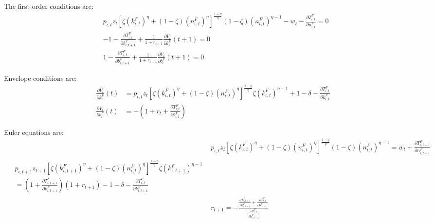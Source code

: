 \documentclass[letterpaper,12pt]{article}
\theoremstyle{definition}
\begin{document}
\begin{spacing}{1.5}
      The first-order conditions are:
      \begin{align}
         & p_{\iota,t} z_t \left[ \zeta (k^F_{\iota,t})^\eta + (1-\zeta)(n^F_{\iota,t})^\eta \right]^{\frac{1-\eta}{\eta}}(1-\zeta)(n^F_{\iota,t})^{\eta-1} - w_t - \frac{\partial T^F_{\iota,t}}{\partial n^F_{\iota,t}}  = 0 \nonumber\\
         & -1 - \frac{\partial T^F_{\iota,t}}{\partial k^F_{\iota,t+1}} + \frac{1}{1+r_{t+1}} \frac{\partial V_\iota}{\partial k^F_{\iota}}(t+1) = 0 \nonumber \\
         & 1 - \frac{\partial T^F_{\iota,t}}{\partial b^F_{\iota,t+1}} + \frac{1}{1+r_{t+1}} \frac{\partial V_\iota}{\partial b^F_{\iota}}(t+1) = 0 \nonumber 
      \end{align}

      Envelope conditions are:
      \begin{align}
         \frac{\partial V_\iota}{\partial k^F_{\iota}}(t) & = p_{\iota,t} z_t \left[ \zeta (k^F_{\iota,t})^\eta + (1-\zeta)(n^F_{\iota,t})^\eta \right]^{\frac{1-\eta}{\eta}}\zeta (k^F_{\iota,t})^{\eta-1} + 1 - \delta - \frac{\partial T^F_{\iota,t}}{\partial k^F_{\iota,t}}  \nonumber \\
         \frac{\partial V_\iota}{\partial b^F_{\iota}}(t) & = - \left( 1+r_t+\frac{\partial T^F_{\iota,t}}{\partial b^F_{\iota,t}} \right) \nonumber 
      \end{align}

      Euler equations are:
      \begin{align}
         & p_{\iota,t} z_t \left[ \zeta (k^F_{\iota,t})^\eta + (1-\zeta)(n^F_{\iota,t})^\eta \right]^{\frac{1-\eta}{\eta}}(1-\zeta)(n^F_{\iota,t})^{\eta-1} = w_t + \frac{\partial T^F_{\iota,t+1}}{\partial n^F_{\iota,t+1}} \label{EqEulern}\\
         \begin{split}
         & p_{\iota,t+1} z_{t+1} \left[ \zeta (k^F_{\iota,t+1})^\eta + (1-\zeta)(n^F_{\iota,t})^\eta \right]^{\frac{1-\eta}{\eta}}\zeta (k^F_{\iota,t+1})^{\eta-1} \\
         & = \left( 1 + \frac{\partial T^F_{\iota,t+1}}{\partial k^F_{\iota,t+1}} \right) \left( 1+r_{t+1} \right) - 1 - \delta - \frac{\partial T^F_{\iota,t}}{\partial k^F_{\iota,t+1}} \label{EqEulerk} 
         \end{split} \\
         & r_{t+1} = - \frac{ \frac{\partial T^F_{\iota,t+1}}{\partial b^F_{\iota,t+1}} + \frac{\partial T^F_{\iota,t}}{\partial b^F_{\iota,t+1}} } { \frac{\partial T^F_{\iota,t}}{\partial b^F_{\iota,t+1}} } \label{EqEulerb}
      \end{align}


\end{spacing}
\end{document}
